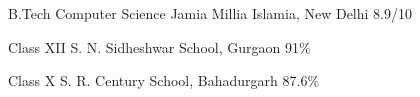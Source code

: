     {B.Tech}
    {Computer Science}
    {Jamia Millia Islamia, New Delhi}
    {8.9/10}
    {}

    {Class XII}
    {}
    {S. N. Sidheshwar School, Gurgaon}
    {91\%}
    {}

    {Class X}
    {}
    {S. R. Century School, Bahadurgarh}
    {87.6\%}
    {}
